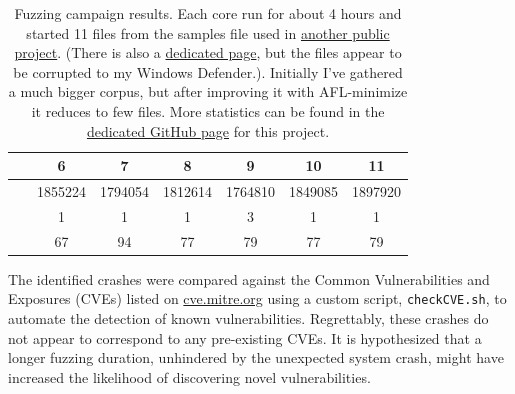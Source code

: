 \documentclass[a4paper,10pt]{article}
\begin{document}
\begin{table}
    \centering
    \begin{tabular}{l|cccccc}
    \qquad \qquad \qquad \ & 6       & 7       & 8       & 9       & 10      & 11 \\ \hline
        & 1855224 & 1794054 & 1812614 & 1764810 & 1849085 & 1897920\\
        & 1       & 1       & 1       & 3       & 1       & 1 \\
        & 67      & 94      & 77      & 79      & 77      & 79 \\
    \end{tabular}
    \caption{Fuzzing campaign results. Each core run for about 4 hours and started 11 files from the samples file used in \href{https://github.com/moshekaplan/FuzzImageMagick}{another public project}. (There is also a \href{https://lcamtuf.coredump.cx/afl/demo/}{dedicated page}, but the files appear to be corrupted to my Windows Defender.). Initially I've gathered a much bigger corpus, but after improving it with AFL-minimize it reduces to few files. More statistics can be found in the \href{https://github.com/AntoninoRando/SoftwareSecurity}{dedicated GitHub page} for this project.}
    \label{tab:my_label}
\end{table}


The identified crashes were compared against the Common Vulnerabilities and Exposures (CVEs) listed on \href{https://cve.mitre.org/cgi-bin/cvekey.cgi?keyword=imagemagick}{cve.mitre.org} using a custom script, \verb|checkCVE.sh|, to automate the detection of known vulnerabilities. Regrettably, these crashes do not appear to correspond to any pre-existing CVEs. It is hypothesized that a longer fuzzing duration, unhindered by the unexpected system crash, might have increased the likelihood of discovering novel vulnerabilities.
\end{document}
